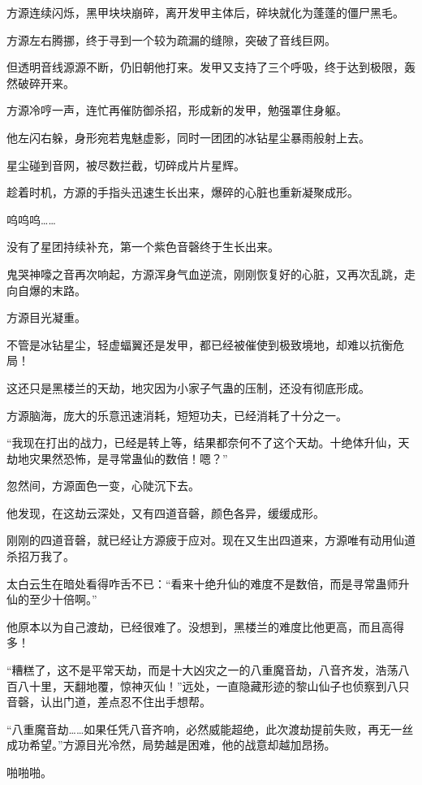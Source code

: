 \begin{this_body}
方源连续闪烁，黑甲块块崩碎，离开发甲主体后，碎块就化为蓬蓬的僵尸黑毛。

方源左右腾挪，终于寻到一个较为疏漏的缝隙，突破了音线巨网。

但透明音线源源不断，仍旧朝他打来。发甲又支持了三个呼吸，终于达到极限，轰然破碎开来。

方源冷哼一声，连忙再催防御杀招，形成新的发甲，勉强罩住身躯。

他左闪右躲，身形宛若鬼魅虚影，同时一团团的冰钻星尘暴雨般射上去。

星尘碰到音网，被尽数拦截，切碎成片片星辉。

趁着时机，方源的手指头迅速生长出来，爆碎的心脏也重新凝聚成形。

呜呜呜……

没有了星团持续补充，第一个紫色音磬终于生长出来。

鬼哭神嚎之音再次响起，方源浑身气血逆流，刚刚恢复好的心脏，又再次乱跳，走向自爆的末路。

方源目光凝重。

不管是冰钻星尘，轻虚蝠翼还是发甲，都已经被催使到极致境地，却难以抗衡危局！

这还只是黑楼兰的天劫，地灾因为小家子气蛊的压制，还没有彻底形成。

方源脑海，庞大的乐意迅速消耗，短短功夫，已经消耗了十分之一。

“我现在打出的战力，已经是转上等，结果都奈何不了这个天劫。十绝体升仙，天劫地灾果然恐怖，是寻常蛊仙的数倍！嗯？”

忽然间，方源面色一变，心陡沉下去。

他发现，在这劫云深处，又有四道音磬，颜色各异，缓缓成形。

刚刚的四道音磬，就已经让方源疲于应对。现在又生出四道来，方源唯有动用仙道杀招万我了。

太白云生在暗处看得咋舌不已：“看来十绝升仙的难度不是数倍，而是寻常蛊师升仙的至少十倍啊。”

他原本以为自己渡劫，已经很难了。没想到，黑楼兰的难度比他更高，而且高得多！

“糟糕了，这不是平常天劫，而是十大凶灾之一的八重魔音劫，八音齐发，浩荡八百八十里，天翻地覆，惊神灭仙！”远处，一直隐藏形迹的黎山仙子也侦察到八只音磬，认出门道，差点忍不住出手想帮。

“八重魔音劫……如果任凭八音齐响，必然威能超绝，此次渡劫提前失败，再无一丝成功希望。”方源目光冷然，局势越是困难，他的战意却越加昂扬。

啪啪啪。


\end{this_body}
